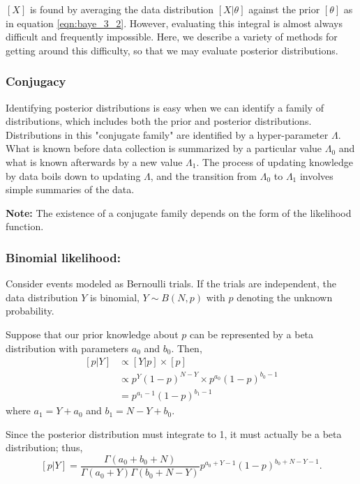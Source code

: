 \documentclass[12pt,oneside,a4paper]{book}
\theoremstyle{definition}
\theoremstyle{remark}
\begin{document}
				$[X]$ is found by averaging the data distribution $[X|\theta]$ against the prior $[\theta]$ as in equation \eqref{eqn:baye_3_2}. However, evaluating this integral is almost always difficult and frequently impossible. Here, we describe a variety of methods for getting around this difficulty, so that we may evaluate posterior distributions.

			\subsubsection{Conjugacy}
				Identifying posterior distributions is easy when we can identify a family of distributions, which includes both the prior and posterior distributions. Distributions in this "conjugate family" are identified by a hyper-parameter $\Lambda$.
				What is known before data collection is summarized by a particular value $\Lambda_0$ and what is known afterwards by a new value $\Lambda_1$. The process of updating knowledge by data boils down to updating $\Lambda$, and the transition from $\Lambda_0$ to $\Lambda_1$ involves simple summaries of the data.

				\textbf{Note:} The existence of a conjugate family depends on the form of the likelihood function.

				\subsubsection{Binomial likelihood:}
					Consider events modeled as Bernoulli trials. If the trials are independent, the data distribution $Y$ is binomial, $Y \sim B(N,p)$ with $p$ denoting the unknown probability.

					Suppose that our prior knowledge about $p$ can be represented by a beta distribution with parameters $a_0$ and $b_0$. Then,
					\begin{equation*}
						\begin{aligned}
							[p|Y] &\propto [Y|p]\times[p]\\
							&\propto p^{Y}(1-p)^{N-Y} \times p^{a_0}(1-p)^{b_0-1}\\
							&=p^{a_1-1}(1-p)^{b_1-1}
						\end{aligned}
					\end{equation*}
					where $a_1 = Y+a_0$ and $b_1 = N-Y+b_0$.

					Since the posterior distribution must integrate to 1, it must actually be a beta distribution; thus,
					\[
						[p|Y] = \frac{\Gamma(a_0+b_0+N)}{\Gamma(a_0+Y)\Gamma(b_0+N-Y)}p^{a_0+Y-1}(1-p)^{b_0+N-Y-1}.
					\]
\end{document}

